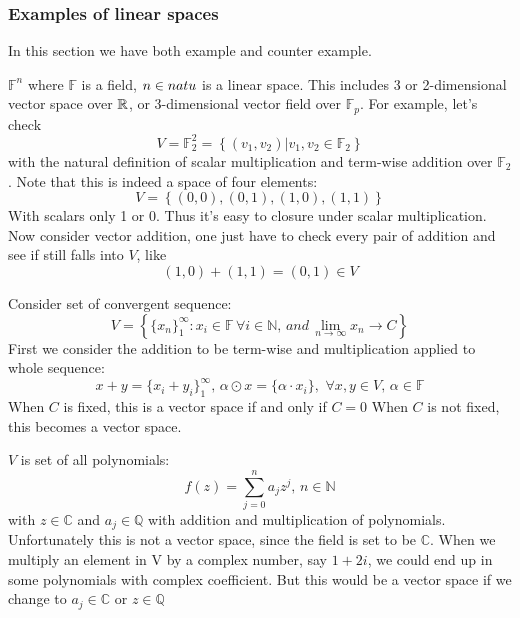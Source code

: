 \subsubsection{Examples of linear spaces}
In this section we have both example and counter example.
\begin{example}\rm\nextline
	$\mathbb{F}^n$ where $\mathbb{F}$ is a field, $n\in\\natu$ is a linear space. This includes 3 or 2-dimensional vector space over $\mathbb{R}$, or 3-dimensional vector field over $\mathbb{F}_p$. For example, let's check
	$$
		V=\mathbb{F}_2^2=\left\{(v_1,v_2)|v_1,v_2\in\mathbb{F}_2\right\}
	$$
	with the natural definition of scalar multiplication and term-wise addition over $\mathbb{F}_2$. Note that this is indeed a space of four elements:
	$$
		V=\left\{(0,0),(0,1),(1,0),(1,1)\right\}
	$$
	With scalars only 1 or 0. Thus it's easy to closure under scalar multiplication. Now consider vector addition, one just have to check every pair of addition and see if still falls into $V$, like
	$$
		(1,0)+(1,1)=(0,1)\in V
	$$
\end{example}
\begin{example}\rm\nextline
	Consider set of convergent sequence:
	$$
		V=\left\{\{x_n\}_1^\infty:x_i\in\mathbb{F}\,\forall i\in\mathbb{N},\,and\, \lim_{n\to \infty}x_n\to C\right\}
	$$
	First we consider the addition to be term-wise and multiplication applied to whole sequence:
	$$
		x+y=\{x_i+y_i\}_1^\infty,\,\alpha\odot x=\{\alpha\cdot x_i\},\,\,\forall x,y\in V,\,\alpha\in\mathbb{F}
	$$
	When $C$ is fixed, this is a vector space if and only if $C=0$
	When $C$ is not fixed, this becomes a vector space.
\end{example}

\begin{example}[Polynomials]\rm\nextline
	$V$ is set of all polynomials:
	$$
		f(z)=\sum_{j=0}^{n}a_jz^j,\,n\in\mathbb{N}
	$$
	with $z\in\mathbb{C}$ and $a_j\in{\mathbb{Q}}$ with addition and multiplication of polynomials. Unfortunately this is not a vector space, since the field is set to be $\mathbb{C}$. When we multiply an element in V by a complex number, say $1+2i$, we could end up in some polynomials with complex coefficient. But this would be a vector space if we change to $a_j\in \mathbb{C}$ or $z\in\mathbb{Q}$
\end{example}

